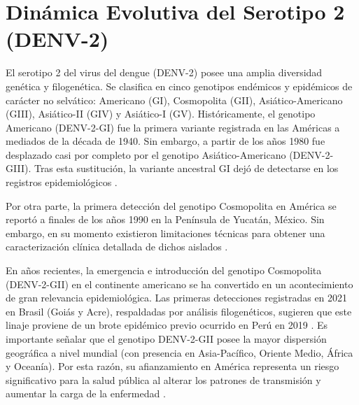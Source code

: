 \chapter{Dinámica Evolutiva del Serotipo 2 (DENV-2)}
El serotipo 2 del virus del dengue (DENV-2) posee una amplia diversidad genética y filogenética. Se clasifica en cinco genotipos endémicos y epidémicos de carácter no selvático: Americano (GI), Cosmopolita (GII), Asiático-Americano (GIII), Asiático-II (GIV) y Asiático-I (GV). Históricamente, el genotipo Americano (DENV-2-GI) fue la primera variante registrada en las Américas a mediados de la década de 1940. Sin embargo, a partir de los años 1980 fue desplazado casi por completo por el genotipo Asiático-Americano (DENV-2-GIII). Tras esta sustitución, la variante ancestral GI dejó de detectarse en los registros epidemiológicos \cite{allicock2012phylogeography}.

Por otra parte, la primera detección del genotipo Cosmopolita en América se reportó a finales de los años 1990 en la Península de Yucatán, México. Sin embargo, en su momento existieron limitaciones técnicas para obtener una caracterización clínica detallada de dichos aislados \cite{hou2024fullerene}.

En años recientes, la emergencia e introducción del genotipo Cosmopolita (DENV-2-GII) en el continente americano se ha convertido en un acontecimiento de gran relevancia epidemiológica. Las primeras detecciones registradas en 2021 en Brasil (Goiás y Acre), respaldadas por análisis filogenéticos, sugieren que este linaje proviene de un brote epidémico previo ocurrido en Perú en 2019 \cite{amorim2023emergence}. Es importante señalar que el genotipo DENV-2-GII posee la mayor dispersión geográfica a nivel mundial (con presencia en Asia-Pacífico, Oriente Medio, África y Oceanía). Por esta razón, su afianzamiento en América representa un riesgo significativo para la salud pública al alterar los patrones de transmisión y aumentar la carga de la enfermedad \cite{hou2024fullerene}. 

